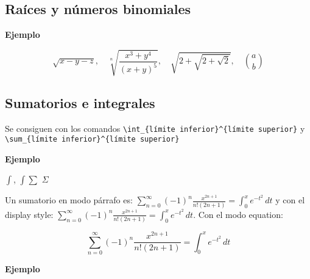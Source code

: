 \documentclass[10pt,a4paper]{report}
\begin{document}
\subsection{Raíces y números binomiales}



\bigskip
\textbf{Ejemplo}

\begin{equation*}
\sqrt{x-y-z},
\quad
\sqrt[n]{\frac{x^3+y^4}{(x+y)^5}},
\quad
\sqrt{2+\sqrt{2+\sqrt{2}}},
\quad
\binom{a}{b}
\end{equation*}
\bigskip






\subsection{Sumatorios e integrales}



Se consiguen con los comandos \verb+\int_{límite inferior}^{límite superior}+ y  \newline
\verb+\sum_{límite inferior}^{límite superior}+



\bigskip
\textbf{Ejemplo}

$\int$, \quad $\displaystyle\int$\quad $\sum$ \quad $\Sigma$

\bigskip

Un sumatorio en modo párrafo es:
%
$\sum_{n=0}^{\infty}(-1)^n\frac{x^{2n+1}}{n!(2n+1)}
=
\int_{0}^{x}e^{-t^2}\,dt$ 
y con el display style: 
$\displaystyle\sum_{n=0}^{\infty}(-1)^n\frac{x^{2n+1}}{n!(2n+1)}
=
\int_{0}^{x}e^{-t^2}\,dt$. Con el modo equation:

\begin{equation}
\sum_{n=0}^{\infty}(-1)^n\frac{x^{2n+1}}{n!(2n+1)}
=
\int_{0}^{x}e^{-t^2}\,dt
\end{equation}

\bigskip




\bigskip
\textbf{Ejemplo}
\end{document}
